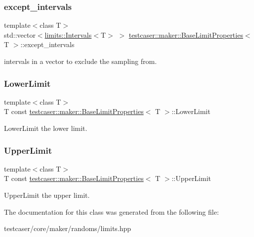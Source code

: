 \subsubsection{\texorpdfstring{except\_intervals}{except\_intervals}}
{\footnotesize\ttfamily template$<$class T$>$ \\
std\+::vector$<$\mbox{\hyperlink{structtestcaser_1_1maker_1_1limits_1_1Intervals}{limits\+::\+Intervals}}$<$T$>$ $>$ \mbox{\hyperlink{classtestcaser_1_1maker_1_1BaseLimitProperties}{testcaser\+::maker\+::\+Base\+Limit\+Properties}}$<$ T $>$\+::except\+\_\+intervals\hspace{0.3cm}{\ttfamily [protected]}}



intervals in a vector to exclude the sampling from. 

\mbox{\label{classtestcaser_1_1maker_1_1BaseLimitProperties_a074bc1b980f1cce9d944a01964b13b70}} 
\subsubsection{\texorpdfstring{LowerLimit}{LowerLimit}}
{\footnotesize\ttfamily template$<$class T$>$ \\
T const \mbox{\hyperlink{classtestcaser_1_1maker_1_1BaseLimitProperties}{testcaser\+::maker\+::\+Base\+Limit\+Properties}}$<$ T $>$\+::Lower\+Limit}



Lower\+Limit the lower limit. 

\mbox{\label{classtestcaser_1_1maker_1_1BaseLimitProperties_a26f4a88b77b97786c53a431454ff078a}} 
\subsubsection{\texorpdfstring{UpperLimit}{UpperLimit}}
{\footnotesize\ttfamily template$<$class T$>$ \\
T const \mbox{\hyperlink{classtestcaser_1_1maker_1_1BaseLimitProperties}{testcaser\+::maker\+::\+Base\+Limit\+Properties}}$<$ T $>$\+::Upper\+Limit}



Upper\+Limit the upper limit. 



The documentation for this class was generated from the following file\+:\begin{DoxyCompactItemize}
\item 
testcaser/core/maker/randoms/limits.\+hpp\end{DoxyCompactItemize}
